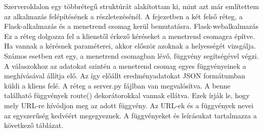 


Szerveroldalon egy többrétegű struktúrát alakítottam ki, mint azt már említettem az alkalmazás felépítésének a részletezésénél. A fejezetben a két felső réteg, a Flask-alkalmazás és a menetrend csomag kerül bemutatásra.
Flask-webalkalmazás
Ez a réteg dolgozza fel a klienstől érkező kéréseket a menetrend csomagra építve. Ha vannak a kérésnek paraméterei, akkor először azoknak a helyességét vizsgálja. Számos esetben ezt egy, a menetrend csomagban lévő, függvény segítségével végzi. A válaszokhoz az adatokat szintén a menetrend csomag egyes függvényeinek a meghívásával állítja elő. Az így előállt eredményadatokat JSON formátumban küldi a kliens felé.
A réteg a server.py fájlban van megvalósítva. A benne található függvények route() dekorátorokkal vannak ellátva. Ezek írják le, hogy mely URL-re hívódjon meg az adott függvény. Az URL-ek és a függvények nevei az egyszerűség kedvéért megegyeznek.
A függvényeket és leírásukat tartalmazza a következő táblázat.

